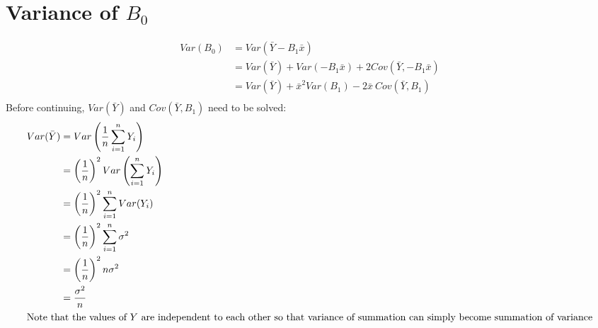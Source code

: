 \documentclass{article}
\begin{document}
\section*{Variance of $B_0$}
\begin{align*}
    Var(B_0) & = Var(\bar{Y} - B_1 \bar{x})                                      \\
             & = Var(\bar{Y}) + Var(- B_1 \bar{x}) + 2Cov(\bar{Y}, -B_1 \bar{x}) \\
             & = Var(\bar{Y}) + \bar{x}^2 Var(B_1) - 2\bar{x}\:Cov(\bar{Y}, B_1) \\
\end{align*}
Before continuing, $Var(\bar{Y})$ and $Cov(\bar{Y}, B_1)$ need to be solved:
\begin{align*}
    Var(\bar{Y}) & = Var \left( \frac{1}{n} \sum_{i=1}^n Y_i \right)                \\
                 & = \left(\frac{1}{n}\right)^2 Var \left( \sum_{i=1}^n Y_i \right) \\
                 & = \left(\frac{1}{n}\right)^2 \sum_{i=1}^n Var(Y_i)               \\
                 & = \left(\frac{1}{n}\right)^2 \sum_{i=1}^n \sigma^2               \\
                 & = \left(\frac{1}{n}\right)^2 n \sigma^2                          \\
                 & = \frac{\sigma^2}{n}                                             \\
    \intertext{Note that the values of $Y$ are independent to each other so that variance of summation can simply become summation of variance}
\end{align*}
\end{document}
